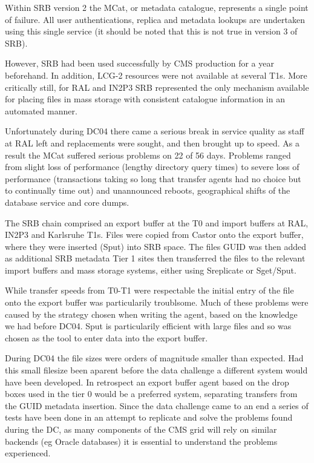 \documentclass{cmspaper}
\begin{document}
Within SRB version 2 the MCat, or metadata catalogue, represents a
single point of failure. All user authentications, replica and
metadata lookups are undertaken using this single service (it should
be noted that this is not true in version 3 of SRB).

However, SRB had been used successfully by CMS production for a year
beforehand.  In addition, LCG-2 resources were not available at
several T1s. More critically still, for RAL and IN2P3 SRB represented
the only mechanism available for placing files in mass storage with
consistent catalogue information in an automated manner.

Unfortunately during DC04 there came a serious break in service
quality as staff at RAL left and replacements were sought, and then
brought up to speed.  As a result the MCat suffered serious problems
on 22 of 56 days. Problems ranged from slight loss of performance
(lengthy directory query times) to severe loss of performance
(transactions taking so long that transfer agents had no choice but to
continually time out) and unannounced reboots, geographical shifts of
the database service and core dumps.

The SRB chain comprised an export buffer at the T0 and import buffers
at RAL, IN2P3 and Karlsruhe T1s. Files were copied from Castor onto
the export buffer, where they were inserted (Sput) into SRB space. The
files GUID was then added as additional SRB metadata Tier 1 sites then
transferred the files to the relevant import buffers and mass storage
systems, either using Sreplicate or Sget/Sput.

While transfer speeds from T0-T1 were respectable %
 the initial entry of the file onto the export buffer was
particularily troublsome.  Much of these problems were caused by the
strategy chosen when writing the agent, based on the knowledge we had
before DC04. Sput is particularily efficient with large files and so
was chosen as the tool to enter data into the export buffer.

During DC04 the file sizes were orders of magnitude smaller than
expected. Had this small filesize been aparent before the data
challenge a different system would have been developed. In retrospect
an export buffer agent based on the drop boxes used in the tier 0
would be a preferred system, separating transfers from the GUID
metadata insertion.  Since the data challenge came to an end a series
of tests have been done in an attempt to replicate and solve the
problems found during the DC, as many components of the CMS grid will
rely on similar backends (eg Oracle databases) it is essential to
understand the problems experienced.
\end{document}
